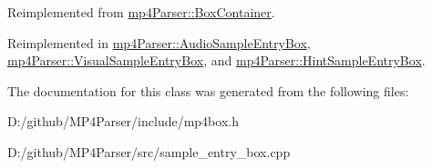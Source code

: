 Reimplemented from \mbox{\hyperlink{classmp4_parser_1_1_box_container_a84274dc2397087178ea6858971d399ee}{mp4\+Parser\+::\+Box\+Container}}.



Reimplemented in \mbox{\hyperlink{classmp4_parser_1_1_audio_sample_entry_box_ab65dfb4aee59ecd374567ceafe58de4f}{mp4\+Parser\+::\+Audio\+Sample\+Entry\+Box}}, \mbox{\hyperlink{classmp4_parser_1_1_visual_sample_entry_box_a336c8d02232f769e50dcbd4c031bf274}{mp4\+Parser\+::\+Visual\+Sample\+Entry\+Box}}, and \mbox{\hyperlink{classmp4_parser_1_1_hint_sample_entry_box_aa9a7e41f4bd9773fe31b867743d93d8f}{mp4\+Parser\+::\+Hint\+Sample\+Entry\+Box}}.



The documentation for this class was generated from the following files\+:\begin{DoxyCompactItemize}
\item 
D\+:/github/\+M\+P4\+Parser/include/mp4box.\+h\item 
D\+:/github/\+M\+P4\+Parser/src/sample\+\_\+entry\+\_\+box.\+cpp\end{DoxyCompactItemize}
